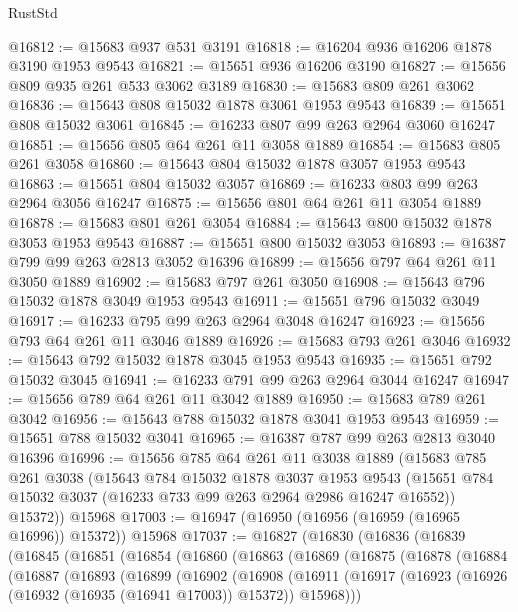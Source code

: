 \begin{lexlean}{RustStd}
\begin{coremodule}
@16812 := @15683 @937 @531 @3191
@16818 := @16204 @936 @16206 @1878 @3190 @1953 @9543
@16821 := @15651 @936 @16206 @3190
@16827 := @15656 @809 @935 @261 @533 @3062 @3189
@16830 := @15683 @809 @261 @3062
@16836 := @15643 @808 @15032 @1878 @3061 @1953 @9543
@16839 := @15651 @808 @15032 @3061
@16845 := @16233 @807 @99 @263 @2964 @3060 @16247
@16851 := @15656 @805 @64 @261 @11 @3058 @1889
@16854 := @15683 @805 @261 @3058
@16860 := @15643 @804 @15032 @1878 @3057 @1953 @9543
@16863 := @15651 @804 @15032 @3057
@16869 := @16233 @803 @99 @263 @2964 @3056 @16247
@16875 := @15656 @801 @64 @261 @11 @3054 @1889
@16878 := @15683 @801 @261 @3054
@16884 := @15643 @800 @15032 @1878 @3053 @1953 @9543
@16887 := @15651 @800 @15032 @3053
@16893 := @16387 @799 @99 @263 @2813 @3052 @16396
@16899 := @15656 @797 @64 @261 @11 @3050 @1889
@16902 := @15683 @797 @261 @3050
@16908 := @15643 @796 @15032 @1878 @3049 @1953 @9543
@16911 := @15651 @796 @15032 @3049
@16917 := @16233 @795 @99 @263 @2964 @3048 @16247
@16923 := @15656 @793 @64 @261 @11 @3046 @1889
@16926 := @15683 @793 @261 @3046
@16932 := @15643 @792 @15032 @1878 @3045 @1953 @9543
@16935 := @15651 @792 @15032 @3045
@16941 := @16233 @791 @99 @263 @2964 @3044 @16247
@16947 := @15656 @789 @64 @261 @11 @3042 @1889
@16950 := @15683 @789 @261 @3042
@16956 := @15643 @788 @15032 @1878 @3041 @1953 @9543
@16959 := @15651 @788 @15032 @3041
@16965 := @16387 @787 @99 @263 @2813 @3040 @16396
@16996 := @15656
    @785
    @64
    @261
    @11
    @3038
    @1889
    (@15683
      @785
      @261
      @3038
      (@15643
        @784
        @15032
        @1878
        @3037
        @1953
        @9543
        (@15651 @784 @15032 @3037 (@16233 @733 @99 @263 @2964 @2986 @16247 @16552))
        @15372))
    @15968
@17003 := @16947 (@16950 (@16956 (@16959 (@16965 @16996)) @15372)) @15968
@17037 := @16827
    (@16830
      (@16836
        (@16839
          (@16845
            (@16851
              (@16854
                (@16860
                  (@16863
                    (@16869
                      (@16875
                        (@16878
                          (@16884
                            (@16887
                              (@16893
                                (@16899
                                  (@16902
                                    (@16908
                                      (@16911
                                        (@16917
                                          (@16923
                                            (@16926 (@16932 (@16935 (@16941 @17003)) @15372))
                                            @15968)))

\end{coremodule}
\end{lexlean}
